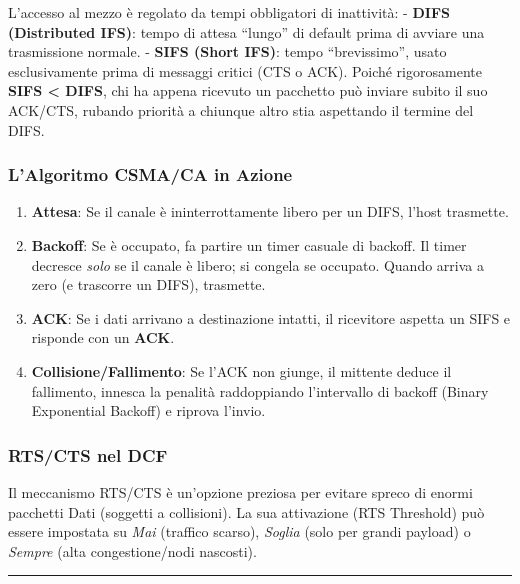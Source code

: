 \documentclass[
  italian,
  openany]{book}
\providecommand{\tightlist}{%
  \setlength{\itemsep}{0pt}\setlength{\parskip}{0pt}}
\begin{document}
L'accesso al mezzo è regolato da tempi obbligatori di inattività: -
\textbf{DIFS (Distributed IFS)}: tempo di attesa ``lungo'' di default
prima di avviare una trasmissione normale. - \textbf{SIFS (Short IFS)}:
tempo ``brevissimo'', usato esclusivamente prima di messaggi critici
(CTS o ACK). Poiché rigorosamente \textbf{SIFS \textless{} DIFS}, chi ha
appena ricevuto un pacchetto può inviare subito il suo ACK/CTS, rubando
priorità a chiunque altro stia aspettando il termine del DIFS.

\subsubsection{L'Algoritmo CSMA/CA in
Azione}\label{lalgoritmo-csmaca-in-azione}

\begin{enumerate}
\def\labelenumi{\arabic{enumi}.}
\tightlist
\item
  \textbf{Attesa}: Se il canale è ininterrottamente libero per un DIFS,
  l'host trasmette.
\item
  \textbf{Backoff}: Se è occupato, fa partire un timer casuale di
  backoff. Il timer decresce \emph{solo} se il canale è libero; si
  congela se occupato. Quando arriva a zero (e trascorre un DIFS),
  trasmette.
\item
  \textbf{ACK}: Se i dati arrivano a destinazione intatti, il ricevitore
  aspetta un SIFS e risponde con un \textbf{ACK}.
\item
  \textbf{Collisione/Fallimento}: Se l'ACK non giunge, il mittente
  deduce il fallimento, innesca la penalità raddoppiando l'intervallo di
  backoff (Binary Exponential Backoff) e riprova l'invio.
\end{enumerate}

\subsubsection{RTS/CTS nel DCF}\label{rtscts-nel-dcf}

Il meccanismo RTS/CTS è un'opzione preziosa per evitare spreco di enormi
pacchetti Dati (soggetti a collisioni). La sua attivazione (RTS
Threshold) può essere impostata su \emph{Mai} (traffico scarso),
\emph{Soglia} (solo per grandi payload) o \emph{Sempre} (alta
congestione/nodi nascosti).

\begin{center}\rule{0.5\linewidth}{0.5pt}\end{center}
\end{document}
